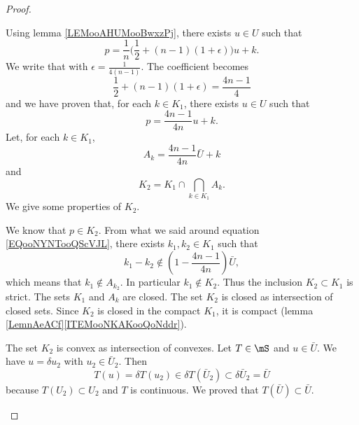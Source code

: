 \begin{proof}
\begin{subproof}
\begin{equation}
		\end{equation}
		Using lemma \ref{LEMooAHUMooBwxzPj}, there exists \( u\in U\) such that
		\begin{equation}
			p=\frac{1}{ n }\big( \frac{ 1 }{2}+(n-1)(1+\epsilon) \big)u+k.
		\end{equation}
		We write that with \( \epsilon=\frac{1}{ 4(n-1) }\). The coefficient becomes
		\begin{equation}
			\frac{ 1 }{2}+(n-1)(1+\epsilon)=\frac{ 4n-1 }{ 4 }
		\end{equation}
		and we have proven that, for each \( k\in K_1\), there exists \( u\in U\) such that
		\begin{equation}
			p=\frac{ 4n-1 }{ 4n }u+k.
		\end{equation}
		\spitem[Definition of \( K_2\)]
		Let, for each \( k\in K_1\),
		\begin{equation}
			A_k=\frac{ 4n-1 }{ 4n }\bar U+k
		\end{equation}
		and
		\begin{equation}
			K_2=K_1\cap\bigcap_{k\in K_1}A_k.
		\end{equation}
		We give some properties of \( K_2\).
		\begin{subproof}
			We know that \( p\in K_2\).
			\spitem[\( K_2\subsetneq K_1\)]
			From what we said around equation \eqref{EQooNYNTooQScVJL}, there exists \( k_1,k_2\in K_1\) such that
			\begin{equation}
				k_1-k_2\notin\left( 1-\frac{ 4n-1 }{ 4n } \right)\bar U,
			\end{equation}
			which means that \( k_1\notin A_{k_2}\). In particular \( k_1\notin K_2\). Thus the inclusion \( K_2\subset K_1\) is strict.
			The sets \( K_1\) and \( A_k\) are closed. The set \( K_2\) is closed as intersection of closed sets. Since \( K_2\) is closed in the compact \( K_1\), it is compact (lemma \ref{LemnAeACf}\ref{ITEMooNKAKooQoNddr}).

			The set \( K_2\) is convex as intersection of convexes.
			\spitem[\( \mS(K_2)\subset K_2\)]
			Let \( T\in \mS\) and \( u\in\bar U\). We have \( u=\delta u_2\) with \( u_2\in\bar U_2\). Then
			\begin{equation}
				T(u)=\delta T(u_2)\in \delta T(\bar U_2)\subset \delta\bar U_2=\bar U
			\end{equation}
			because \( T(U_2)\subset U_2\) and \( T\) is continuous. We proved that \( T(\bar U)\subset \bar U\).


\end{subproof}
\end{subproof}
\end{proof}
